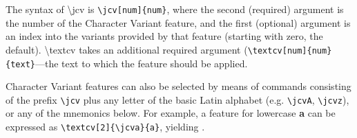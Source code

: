The syntax of \textbackslash jcv
is {\color{BrickRed}\verb|\jcv[num]{num}|}, where the second (required) argument is the number of the Character Variant feature,
and the first (optional) argument is an index into the variants provided by that feature (starting with zero, the default).
\textbackslash textcv takes an additional required argument ({\color{BrickRed}\verb|\textcv[num]{num}{text}|}---the text to which the
feature should be applied.

Character Variant features can also be selected by means of commands consisting of the prefix
{\color{BrickRed}\verb|\jcv|} plus any letter of the basic Latin alphabet (e.g. {\color{BrickRed}\verb|\jcvA|},
{\color{BrickRed}\verb|\jcvz|}), or any of the mnemonics below.
For example, a feature for
lowercase \textbf{a} can be expressed as {\color{BrickRed}\verb|\textcv[2]{\jcva}{a}|},
yielding \textbf{}.

